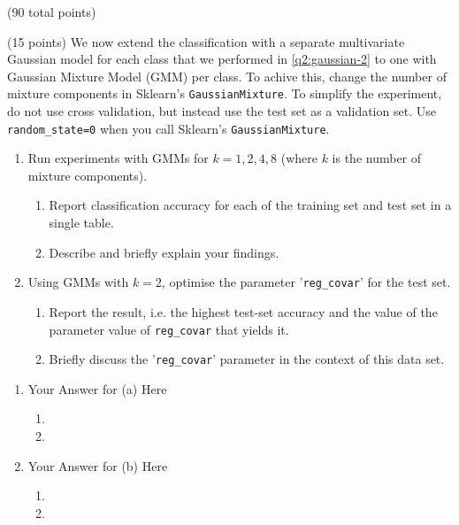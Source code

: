 \documentclass[12pt]{article}
\begin{document}
\begin{question}{(90 total points) \qTwoTitle}
\begin{subquestion}{(15 points)
    We now extend the classification with a separate multivariate Gaussian model for each class that we performed in \ref{q2:gaussian-2} to one with Gaussian Mixture Model (GMM) per class. To achive this, change the number of mixture components in Sklearn's {\tt GaussianMixture}. 
    To simplify the experiment, do not use cross validation, but instead use the test set as a validation set.
    Use {\tt random\_state=0} when you call Sklearn's {\tt GaussianMixture}.
  }
  \begin{enumerate}\NARROWITEM
  \item Run experiments with GMMs for $k = 1,2,4,8$ (where $k$ is the number of mixture components).
    \begin{enumerate}\NARROWITEM
    \item Report classification accuracy for each of the training set and test set in a single table.
    \item Describe and briefly explain your findings.
    \end{enumerate}
  \item Using GMMs with $k=2$, optimise the parameter '{\tt reg\_covar}' for the test set.
    \begin{enumerate}\NARROWITEM
    \item Report the result, i.e. the highest test-set accuracy and the value of the parameter value of {\tt reg\_covar} that yields it.
    \item Briefly discuss the '{\tt reg\_covar}' parameter in the context of this data set.
    \end{enumerate}
  \end{enumerate}
   

  \begin{answerbox}{0.65\textheight}
    \begin{enumerate}
    \item Your Answer for (a) Here\hfill
      \begin{enumerate}
      \item 
      \item 
      \end{enumerate}
    \item  Your Answer for (b) Here\hfill
      \begin{enumerate}
      \item 
      \item 
      \end{enumerate}
    \end{enumerate}
  \end{answerbox}
  


\end{subquestion}

\end{question}
\end{document}
